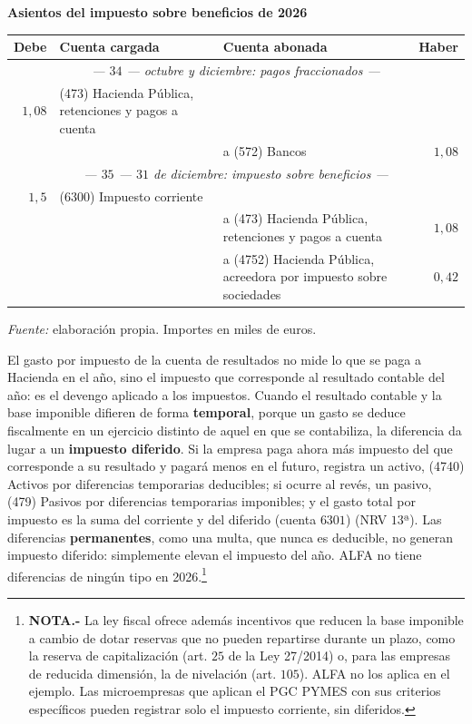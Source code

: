 \documentclass[10pt,a4paper]{article}
\begin{document}
\begin{center}\begin{minipage}{\linewidth}\centering
{\small\textbf{Asientos del impuesto sobre beneficios de 2026}}\par\vspace{0.3em}
{\small
\begin{tabular}{r p{5.6cm} p{6.4cm} r}
\hline
\textbf{Debe} & \textbf{Cuenta cargada} & \textbf{Cuenta abonada} & \textbf{Haber} \\
\hline
\multicolumn{4}{c}{\textit{--- $34$ --- octubre y diciembre: pagos fraccionados ---}} \\
$1,08$ & \raggedright (473) Hacienda Pública, retenciones y pagos a cuenta & & \\
 & & \raggedright a (572) Bancos & $1,08$ \\
\multicolumn{4}{c}{\textit{--- $35$ --- $31$ de diciembre: impuesto sobre beneficios ---}} \\
$1,5$ & (6300) Impuesto corriente & & \\
 & & \raggedright a (473) Hacienda Pública, retenciones y pagos a cuenta & $1,08$ \\
 & & \raggedright a (4752) Hacienda Pública, acreedora por impuesto sobre sociedades & $0,42$ \\
\hline
\end{tabular}}\par\vspace{0.3em}
{\small\textit{Fuente: }elaboración propia. Importes en miles de euros.}
\end{minipage}\end{center}

El gasto por impuesto de la cuenta de resultados no mide lo que se paga a Hacienda en el año, sino el impuesto que corresponde al resultado contable del año: es el devengo aplicado a los impuestos. Cuando el resultado contable y la base imponible difieren de forma \textbf{temporal}, porque un gasto se deduce fiscalmente en un ejercicio distinto de aquel en que se contabiliza, la diferencia da lugar a un \textbf{impuesto diferido}. Si la empresa paga ahora más impuesto del que corresponde a su resultado y pagará menos en el futuro, registra un activo, (4740) Activos por diferencias temporarias deducibles; si ocurre al revés, un pasivo, (479) Pasivos por diferencias temporarias imponibles; y el gasto total por impuesto es la suma del corriente y del diferido (cuenta $6301$) (NRV $13$ª). Las diferencias \textbf{permanentes}, como una multa, que nunca es deducible, no generan impuesto diferido: simplemente elevan el impuesto del año. ALFA no tiene diferencias de ningún tipo en 2026.\footnote{%
    \textbf{NOTA.-} La ley fiscal ofrece además incentivos que reducen la base imponible a cambio de dotar reservas que no pueden repartirse durante un plazo, como la reserva de capitalización (art. $25$ de la Ley 27/2014) o, para las empresas de reducida dimensión, la de nivelación (art. $105$). ALFA no los aplica en el ejemplo. Las microempresas que aplican el PGC PYMES con sus criterios específicos pueden registrar solo el impuesto corriente, sin diferidos.
}
\end{document}
